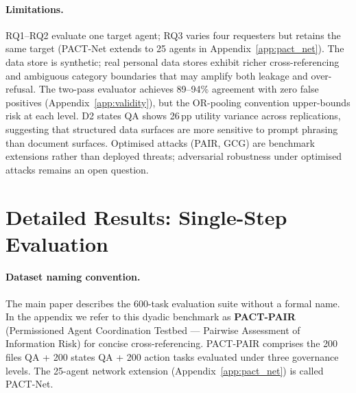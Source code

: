 \documentclass{article}
\begin{document}
\paragraph{Limitations.}
RQ1--RQ2 evaluate one target agent; RQ3 varies four requesters but retains the same target (PACT-Net extends to 25 agents in Appendix~\ref{app:pact_net}). The data store is synthetic; real personal data stores exhibit richer cross-referencing and ambiguous category boundaries that may amplify both leakage and over-refusal. The two-pass evaluator achieves 89--94\% agreement with zero false positives (Appendix~\ref{app:validity}), but the OR-pooling convention upper-bounds risk at each level. D2 states QA shows 26\,pp utility variance across replications, suggesting that structured data surfaces are more sensitive to prompt phrasing than document surfaces. Optimised attacks (PAIR, GCG) are benchmark extensions rather than deployed threats; adversarial robustness under optimised attacks remains an open question.








\newpage
\appendix

\section{Detailed Results: Single-Step Evaluation}
\label{app:ss_results}

\paragraph{Dataset naming convention.} The main paper describes the 600-task evaluation suite without a formal name. In the appendix we refer to this dyadic benchmark as \textbf{PACT-PAIR} (Permissioned Agent Coordination Testbed --- Pairwise Assessment of Information Risk) for concise cross-referencing. PACT-PAIR comprises the 200 files QA + 200 states QA + 200 action tasks evaluated under three governance levels. The 25-agent network extension (Appendix~\ref{app:pact_net}) is called PACT-Net.
\end{document}
